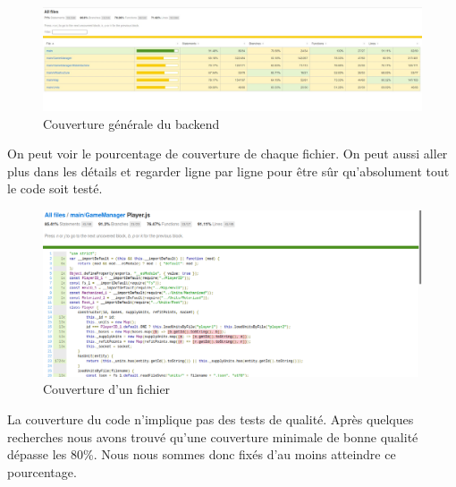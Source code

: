 \begin{figure}[H]
    \centering
    \includegraphics[scale=0.35]{data/couverture_test_1.jpg}
    \caption{Couverture générale du backend}
\end{figure}

On peut voir le pourcentage de couverture de chaque fichier. On peut aussi aller plus dans les détails et regarder ligne par ligne pour être sûr qu'absolument tout le code soit testé.

\begin{figure}[H]
    \centering
    \includegraphics[scale=0.3]{data/couverture_test_2.png}
    \caption{Couverture d'un fichier}
\end{figure}

La couverture du code n'implique pas des tests de qualité. Après quelques recherches nous avons trouvé qu'une couverture minimale de bonne qualité dépasse les 80\%. Nous nous sommes donc fixés d'au moins atteindre ce pourcentage.